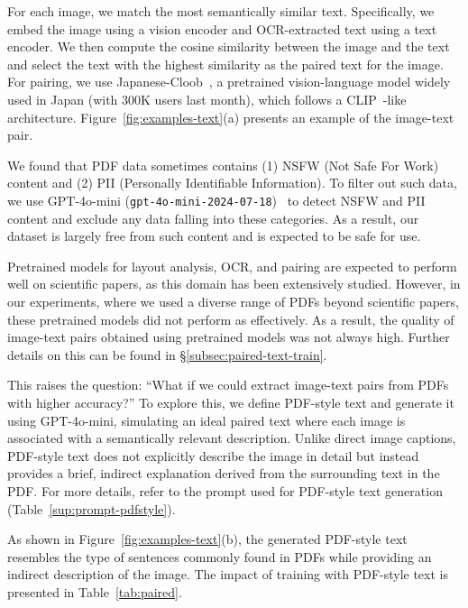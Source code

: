 For each image, we match the most semantically similar text.
Specifically, we embed the image using a vision encoder and OCR-extracted text using a text encoder.
We then compute the cosine similarity between the image and the text and select the text with the highest similarity as the paired text for the image.
For pairing, we use Japanese-Cloob~\cite{rinna-japanese-cloob-vit-b-16,youko-paper}, a pretrained vision-language model widely used in Japan (with 300K users last month), which follows a CLIP~\cite{clip}-like architecture.
Figure~\ref{fig:examples-text}(a) presents an example of the image-text pair.


We found that PDF data sometimes contains (1) NSFW (Not Safe For Work) content and (2) PII (Personally Identifiable Information).
To filter out such data, we use GPT-4o-mini (\texttt{gpt-4o-mini-2024-07-18})~\cite{openai2024gpt4omini} to detect NSFW and PII content and exclude any data falling into these categories.
As a result, our dataset is largely free from such content and is expected to be safe for use.


Pretrained models for layout analysis, OCR, and pairing are expected to perform well on scientific papers, as this domain has been extensively studied.
However, in our experiments, where we used a diverse range of PDFs beyond scientific papers, these pretrained models did not perform as effectively.
As a result, the quality of image-text pairs obtained using pretrained models was not always high.
Further details on this can be found in \S\ref{subsec:paired-text-train}.

This raises the question: ``What if we could extract image-text pairs from PDFs with higher accuracy?''
To explore this, we define PDF-style text and generate it using GPT-4o-mini, simulating an ideal paired text where each image is associated with a semantically relevant description.
Unlike direct image captions, PDF-style text does not explicitly describe the image in detail but instead provides a brief, indirect explanation derived from the surrounding text in the PDF.
For more details, refer to the prompt used for PDF-style text generation (Table~\ref{sup:prompt-pdfstyle}).

As shown in Figure~\ref{fig:examples-text}(b), the generated PDF-style text resembles the type of sentences commonly found in PDFs while providing an indirect description of the image.
The impact of training with PDF-style text is presented in Table~\ref{tab:paired}.


